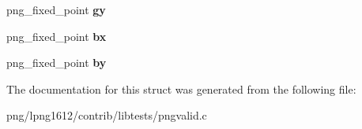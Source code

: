 \begin{DoxyCompactItemize}
\item 
\hypertarget{structchrm__modification_a3490b2a5b3f620252102da45f354504d}{png\+\_\+fixed\+\_\+point {\bfseries gy}}\label{structchrm__modification_a3490b2a5b3f620252102da45f354504d}

\item 
\hypertarget{structchrm__modification_ab684a8763a9dec0df52f0e8dbbfd73c7}{png\+\_\+fixed\+\_\+point {\bfseries bx}}\label{structchrm__modification_ab684a8763a9dec0df52f0e8dbbfd73c7}

\item 
\hypertarget{structchrm__modification_a379d07a23d713d0c352960a78835ae85}{png\+\_\+fixed\+\_\+point {\bfseries by}}\label{structchrm__modification_a379d07a23d713d0c352960a78835ae85}

\end{DoxyCompactItemize}


The documentation for this struct was generated from the following file\+:\begin{DoxyCompactItemize}
\item 
png/lpng1612/contrib/libtests/pngvalid.\+c\end{DoxyCompactItemize}
